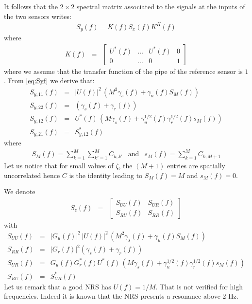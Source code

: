 It follows that the $2\times 2$ spectral matrix associated to the signals at the inputs of the two sensors writes:
\begin{eqnarray}
\label{eq:Syf}
 S_y(f) = K(f) S_x(f) K^H(f)
 \end{eqnarray}
where
\begin{eqnarray*}
K(f)&=&
\begin{bmatrix}
U^*(f)&\ldots&U^*(f)&0
\\
0&\ldots&0&1
\end{bmatrix}
\end{eqnarray*}
where we assume that the transfer function of the pipe of the reference sensor is $1$. From \eqref{eq:Syf} we derive that:
\begin{eqnarray*}
\label{eq:Syentries}
S_{y,11}(f)&=&
|U(f)|^2 \, (M^2\gamma_{s}(f) + \gamma_{u}(f) S_M(f))
\\
S_{y,22}(f)&=&(\gamma_{s}(f) +\gamma_{r}(f))
\\
S_{y,12}(f)&=&
U^{*}(f)\, (M\gamma_{s}(f)+\gamma_{u}^{1/2}(f)\gamma_{r}^{1/2}(f)s_M(f))
\\
S_{y,21}(f)&=&S_{y,12}^{*}(f)
\end{eqnarray*}
where
\begin{eqnarray*}
 S_M(f) =\sum_{k=1}^{M}\sum_{k'=1}^{M}C_{k,k'}
&\mathrm{and}&
 s_M(f) =\sum_{k=1}^{M}C_{k,M+1}
\end{eqnarray*}
Let us notice that for small values of $\zeta$, the $(M+1)$ entries are spatially uncorrelated hence $C$ is the identity leading to
$S_M(f)=M$ and $s_M(f) =0$.

We denote 
\begin{eqnarray*}
S_{z}(f)&=&
\begin{bmatrix}
S_{UU}(f)&S_{UR}(f)
\\
S_{RU}(f)&S_{RR}(f)
\end{bmatrix}
\end{eqnarray*}
with
\begin{eqnarray*}
\label{eq:Syentries}
S_{UU}(f)&=& |G_{u}(f)|^2 \,|U(f)|^2 \, (M^2 \gamma_{s}(f)+ \gamma_{u}(f) S_M(f))
\\
S_{RR}(f)&=&|G_{r}(f)|^2 (\gamma_{s}(f)+\gamma_{r}(f))
\\
S_{UR}(f)&=& G_{u}(f)G_{r}^{*}(f)U^{*}(f)\, 
   (M\gamma_{s}(f)+\gamma_{u}^{1/2}(f)\gamma_{r}^{1/2}(f)s_M(f))
\\
S_{RU}(f)&=&S_{UR}^{*}(f)
\end{eqnarray*}
Let us remark that a good NRS has $U(f)=1/M$. That is not verified for high frequencies. Indeed it is known that the NRS presents a resonance above $2$ Hz.

